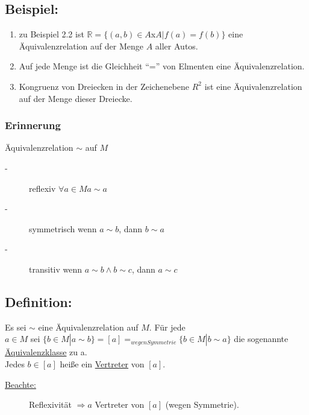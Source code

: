 \subsection{Beispiel:}

  \begin{enumerate}[label={\alph*)}]
     \item zu Beispiel 2.2 ist $\mathbb{R} = \{ (a,b) \in A$x$A|f(a) = f(b)\}$ eine Äquivalenzrelation auf der Menge $A$ aller Autos. 
     \item Auf jede Menge ist die Gleichheit "`="' von Elmenten eine Äquivalenzrelation. 
	\item Kongruenz von Dreiecken in der Zeichenebene $R^{2}$ ist eine Äquivalenzrelation auf der Menge dieser Dreiecke.
  \end{enumerate} 
%
%
%
\subsubsection{Erinnerung}
	Äquivalenzrelation $\sim$ auf $M$
\begin{description}
	\item [-] reflexiv $\forall a \in M a \sim a$
	\item [-] symmetrisch wenn $ a \sim b$, dann $b \sim a$
	\item [-] transitiv wenn $a \sim b \wedge b \sim c$, dann $a \sim c$
\end{description}
%
%
%
\subsection{Definition:}

Es sei $\sim$ eine Äquivalenzrelation auf $M$. Für jede \\
$a \in M$ sei $\{ b \in M | a \sim b\} = [a] =_{wegen Symmetrie} \{b \in M | b\sim a\}$ die sogenannte \underline{Äquivalenzklasse} zu a. \\
Jedes $b \in [a]$ heiße ein \underline{Vertreter} von $[a]$. 
\begin{description}
	\item[\underline{Beachte:}] Reflexivität $\Rightarrow a$ Vertreter von $[a]$ (wegen Symmetrie).
\end{description}
%
%
%

